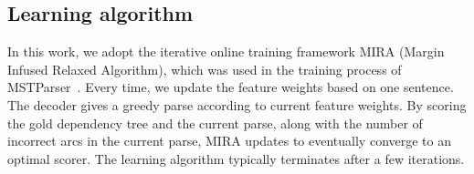 \subsection{Learning algorithm}
In this work, we adopt the iterative online training framework MIRA
(Margin Infused Relaxed Algorithm), which was used in the training process
of MSTParser~\cite{mcdonald2006online}. 
Every time, we update the feature weights based on one sentence. The
decoder gives a greedy parse according to current feature weights.
By scoring the gold dependency tree and the current parse,
along with the number of incorrect arcs in the current parse,
MIRA updates to eventually converge to an optimal scorer.
The learning algorithm typically terminates after a few iterations.
